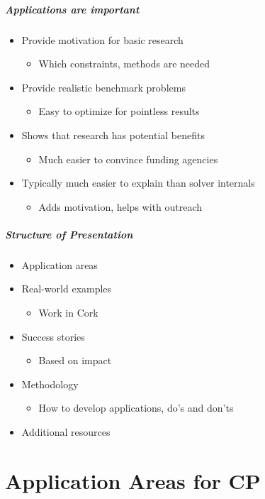 \begin{frame}
\frametitle{Applications are important}
\begin{itemize}
\item Provide motivation for basic research
\begin{itemize}
\item Which constraints, methods are needed
\end{itemize}
\item Provide realistic benchmark problems
\begin{itemize}
\item Easy to optimize for pointless results
\end{itemize}
\item Shows that research has potential benefits
\begin{itemize}
\item Much easier to convince funding agencies
\end{itemize}
\item Typically much easier to explain than solver internals
\begin{itemize}
\item Adds motivation, helps with outreach
\end{itemize}
\end{itemize}
\end{frame}

\begin{frame}
\frametitle{Structure of Presentation}
\begin{itemize}
\item Application areas
\item Real-world examples
\begin{itemize}
\item Work in Cork
\end{itemize}
\item Success stories
\begin{itemize}
\item Based on impact
\end{itemize}
\item Methodology
\begin{itemize}
\item How to develop applications, do's and don'ts
\end{itemize}
\item Additional resources
\end{itemize}
\end{frame}

\part{Application Areas for CP}
\frame{\partpage}

